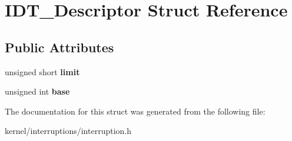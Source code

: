 \hypertarget{structIDT__Descriptor}{}\section{I\+D\+T\+\_\+\+Descriptor Struct Reference}
\label{structIDT__Descriptor}
\subsection*{Public Attributes}
\begin{DoxyCompactItemize}
\item 
unsigned short {\bfseries limit}\hypertarget{structIDT__Descriptor_a819fece98947e8dc901da7307be9e29f}{}\label{structIDT__Descriptor_a819fece98947e8dc901da7307be9e29f}

\item 
unsigned int {\bfseries base}\hypertarget{structIDT__Descriptor_a31215d7a065cf9367ab121375c60182e}{}\label{structIDT__Descriptor_a31215d7a065cf9367ab121375c60182e}

\end{DoxyCompactItemize}


The documentation for this struct was generated from the following file\+:\begin{DoxyCompactItemize}
\item 
kernel/interruptions/interruption.\+h\end{DoxyCompactItemize}
